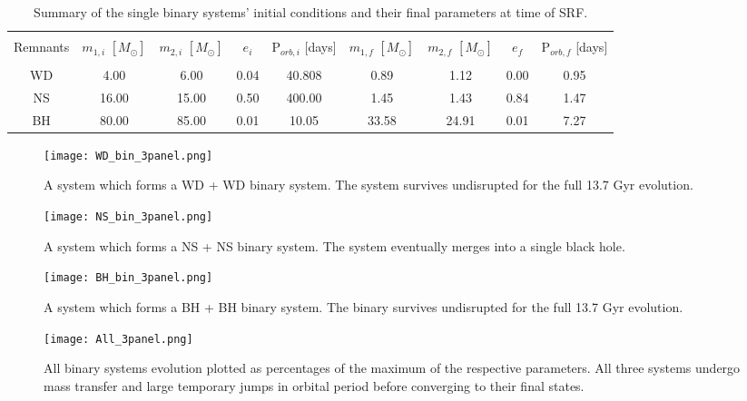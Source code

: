 \documentclass[12pt]{article}
\begin{document}
\begin{table}
\centering
\scriptsize
\begin{tabular}{c|cccccccc}
\hline  \\
Remnants &  $m_{1,i}$ $[M_\odot]$ & $m_{2,i}$ $[M_\odot]$ & $e_i$ & P$_{orb,i}$ [days] &  $m_{1,f} $ $[M_\odot]$ & $m_{2,f}$ $[M_\odot]$ & $e_f$ & P$_{orb, f}$ [days] \\
\\
\hline
WD & 4.00 & 6.00 & 0.04 & 40.808 & 0.89 &  1.12 &  0.00 & 0.95 \\
NS  & 16.00 & 15.00 & 0.50 & 400.00 & 1.45 & 1.43 &  0.84 & 1.47\\
BH & 80.00 & 85.00 & 0.01 & 10.05 & 33.58 & 24.91 & 0.01 & 7.27 \\
\hline
\end{tabular}
\label{Table1}
\caption{Summary of the single binary systems' initial conditions and their final parameters at time of SRF.}
\end{table}


\begin{figure}
    \centering
    \texttt{[image: WD\_bin\_3panel.png]}
    \caption{A system which forms a WD + WD binary system. The system survives undisrupted for the full 13.7 Gyr evolution.}
    \label{Figure1}
\end{figure}

\begin{figure}
    \centering
    \texttt{[image: NS\_bin\_3panel.png]}
    \caption{A system which forms a NS + NS binary system. The system eventually merges into a single black hole.}
    \label{Figure2}
\end{figure}
\begin{figure}
    \centering
    \texttt{[image: BH\_bin\_3panel.png]}
    \caption{A system which forms a BH + BH binary system.  The binary survives undisrupted for the full 13.7 Gyr evolution.}
    \label{Figure3}
\end{figure}
\begin{figure}
    \centering
    \texttt{[image: All\_3panel.png]}
    \caption{All binary systems evolution plotted as percentages of the maximum of the respective parameters. All three systems undergo mass transfer and large temporary jumps in orbital period before converging to their final states.}
    \label{Figure4}
\end{figure}
\end{document}
